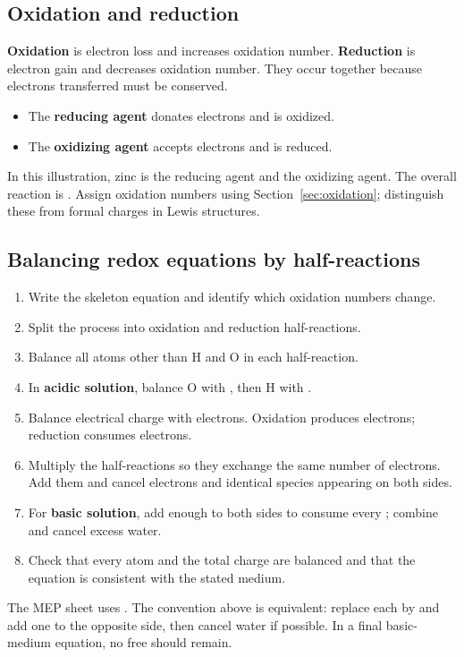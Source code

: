 \documentclass[a4paper,10pt]{article}
\begin{document}
\subsection{Oxidation and reduction}
\textbf{Oxidation} is electron loss and increases oxidation number.
\textbf{Reduction} is electron gain and decreases oxidation number.
They occur together because electrons transferred must be conserved.
\begin{itemize}
  \item The \textbf{reducing agent} donates electrons and is oxidized.
  \item The \textbf{oxidizing agent} accepts electrons and is reduced.
\end{itemize}
In this illustration, zinc is the reducing agent and  the oxidizing agent.
The overall reaction is .
Assign oxidation numbers using Section~\ref{sec:oxidation}; distinguish these
from formal charges in Lewis structures.

\subsection{Balancing redox equations by half-reactions}
\begin{enumerate}
  \item Write the skeleton equation and identify which oxidation numbers change.
  \item Split the process into oxidation and reduction half-reactions.
  \item Balance all atoms other than H and O in each half-reaction.
  \item In \textbf{acidic solution}, balance O with , then H with .
  \item Balance electrical charge with electrons. Oxidation produces electrons;
  reduction consumes electrons.
  \item Multiply the half-reactions so they exchange the same number of electrons.
  Add them and cancel electrons and identical species appearing on both sides.
  \item For \textbf{basic solution}, add enough  to both sides to consume
  every ; combine  and cancel excess water.
  \item Check that every atom and the total charge are balanced and that the
  equation is consistent with the stated medium.
\end{enumerate}
The MEP sheet uses . The  convention above is equivalent:
replace each  by  and add one  to the opposite side,
then cancel water if possible. In a final basic-medium equation, no free
 should remain.
\end{document}

